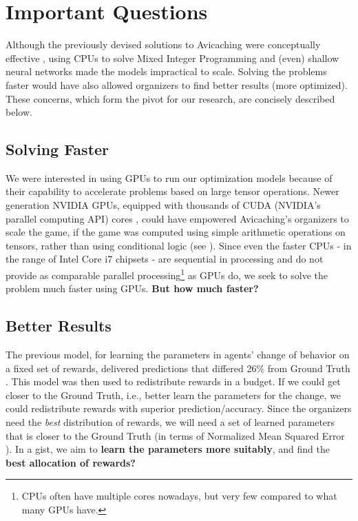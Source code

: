 \section{Important Questions} \label{sec:Important Questions}
Although the previously devised solutions to Avicaching were conceptually effective \cite{Xue2016Avi1, Xue2016Avi2}, using CPUs to solve Mixed Integer Programming and (even) shallow neural networks made the models impractical to scale. Solving the problems faster would have also allowed organizers to find better results (more optimized). These concerns, which form the pivot for our research, are concisely described below.

\subsection{Solving Faster} \label{sec:Important Questions - Solving Faster}
We were interested in using GPUs to run our optimization models because of their capability to accelerate problems based on large tensor operations. Newer generation NVIDIA GPUs, equipped with thousands of CUDA (NVIDIA's parallel computing API) cores \cite{NVIDIA}, could have empowered Avicaching's organizers to scale the game, if the game was computed using simple arithmetic operations on tensors, rather than using conditional logic (see ). Since even the faster CPUs - in the range of Intel Core i7 chipsets - are sequential in processing and do not provide as comparable parallel processing\footnote{CPUs often have multiple cores nowadays, but very few compared to what many GPUs have.} as GPUs do, we seek to solve the problem much faster using GPUs. \textbf{But how much faster?}

\subsection{Better Results} \label{sec:Important Questions - Better Results}
The previous model, for learning the parameters in agents' change of behavior on a fixed set of rewards, delivered predictions that differed 26\% from Ground Truth \cite[Table 1]{Xue2016Avi2}. This model was then used to redistribute rewards in a budget. If we could get closer to the Ground Truth, i.e., better learn the parameters for the change, we could redistribute rewards with superior prediction/accuracy. Since the organizers need the \textit{best} distribution of rewards, we will need a set of learned parameters that is closer to the Ground Truth (in terms of Normalized Mean Squared Error \cite[Section 4.2]{Xue2016Avi2}). In a gist, we aim to \textbf{learn the parameters more suitably}, and find the \textbf{best allocation of rewards?}

